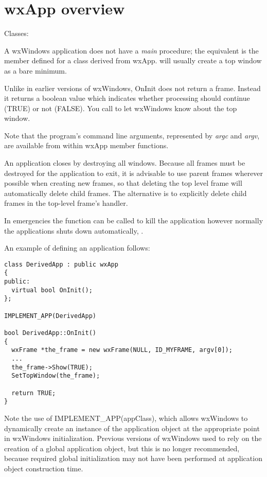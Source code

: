 \section{wxApp overview}\label{wxappoverview}

Classes: 

A wxWindows application does not have a {\it main} procedure; the equivalent is the
\rtfsp{} member defined for a class derived from wxApp.\rtfsp
{} will usually create a top window as a bare minimum.

Unlike in earlier versions of wxWindows, OnInit does not return a frame. Instead it
returns a boolean value which indicates whether processing should continue (TRUE) or not (FALSE).
You call  to let wxWindows know
about the top window.

Note that the program's command line arguments, represented by {\it argc} 
and {\it argv}, are available from within wxApp member functions.

An application closes by destroying all windows. Because all frames must
be destroyed for the application to exit, it is advisable to use parent
frames wherever possible when creating new frames, so that deleting the
top level frame will automatically delete child frames. The alternative
is to explicitly delete child frames in the top-level frame's \rtfsp
handler.

In emergencies the  function can be called to kill the
application however normally the applications shuts down automatically, 
.

An example of defining an application follows:

\begin{verbatim}
class DerivedApp : public wxApp
{
public:
  virtual bool OnInit();
};

IMPLEMENT_APP(DerivedApp)

bool DerivedApp::OnInit()
{
  wxFrame *the_frame = new wxFrame(NULL, ID_MYFRAME, argv[0]);
  ...
  the_frame->Show(TRUE);
  SetTopWindow(the_frame);

  return TRUE;
}
\end{verbatim}

Note the use of IMPLEMENT\_APP(appClass), which allows wxWindows to dynamically create an instance of the application object
at the appropriate point in wxWindows initialization. Previous versions of wxWindows used
to rely on the creation of a global application object, but this is no longer recommended,
because required global initialization may not have been performed at application object
construction time.


